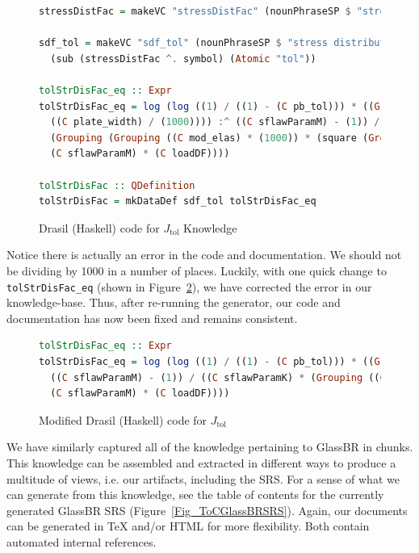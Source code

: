 \documentclass[sigconf]{acmart}
\newcommand{\jtol}{$J_{\mbox{tol}}$}
\newcommand{\inlHask}[1]{\lstinline[language=Haskell, frame=single, showstringspaces=false]{#1}}
\begin{document}
\begin{figure}
\begin{lstlisting}[language=Haskell, frame=single, showstringspaces=false, 
basicstyle=\small] 
stressDistFac = makeVC "stressDistFac" (nounPhraseSP $ "stress distribution" ++ " factor (Function)") cJ

sdf_tol = makeVC "sdf_tol" (nounPhraseSP $ "stress distribution" ++ " factor (Function) based on Pbtol") 
  (sub (stressDistFac ^. symbol) (Atomic "tol"))

tolStrDisFac_eq :: Expr
tolStrDisFac_eq = log (log ((1) / ((1) - (C pb_tol))) * ((Grouping (((C plate_len) / (1000)) * 
  ((C plate_width) / (1000)))) :^ ((C sflawParamM) - (1)) / ((C sflawParamK) * 
  (Grouping (Grouping ((C mod_elas) * (1000)) * (square (Grouping ((C act_thick) / (1000)))))) :^ 
  (C sflawParamM) * (C loadDF))))

tolStrDisFac :: QDefinition
tolStrDisFac = mkDataDef sdf_tol tolStrDisFac_eq
\end{lstlisting}
\caption{Drasil (Haskell) code for \jtol{} Knowledge}
\label{Fig_JtolDrasil}
\end{figure}

Notice there is actually an error in the code and documentation. We should not 
be dividing by 1000 in a number of places. Luckily, with one quick change to 
{\inlHask{tolStrDisFac_eq}} (shown in Figure~\ref{Fig_JtolDrasil_fix}), we have 
corrected the error in our knowledge-base. Thus, after re-running the generator,
our code and documentation has now been fixed and remains consistent.

\begin{figure}
\begin{lstlisting}[language=Haskell, frame=single, showstringspaces=false, 
basicstyle=\small]
tolStrDisFac_eq :: Expr
tolStrDisFac_eq = log (log ((1) / ((1) - (C pb_tol))) * ((Grouping ((C plate_len) * (C plate_width))) :^
  ((C sflawParamM) - (1)) / ((C sflawParamK) * (Grouping ((C mod_elas) * (square (C act_thick)))) :^ 
  (C sflawParamM) * (C loadDF))))
\end{lstlisting}
\caption{Modified Drasil (Haskell) code for \jtol{}}
\label{Fig_JtolDrasil_fix}
\end{figure}

We have similarly captured all of the knowledge pertaining to GlassBR in chunks.
This knowledge can be assembled and extracted in different ways to produce a 
multitude of views, i.e. our artifacts, including the SRS. For a sense of what 
we can generate from this knowledge, see the table of contents for the currently
generated GlassBR SRS (Figure~\ref{Fig_ToCGlassBRSRS}). Again, our documents can
be generated in TeX and/or HTML for more flexibility. Both contain automated 
internal references.
\end{document}
